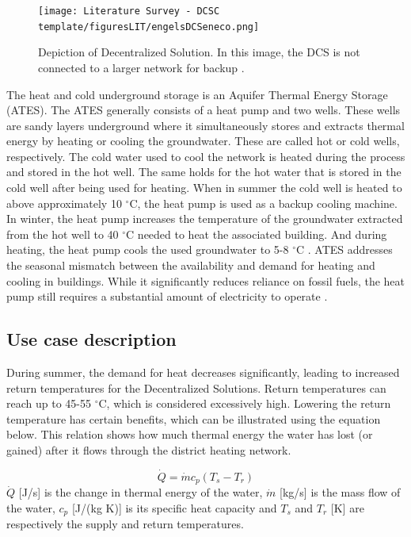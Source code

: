\begin{figure}[h]
    \centering
    \texttt{[image: Literature Survey - DCSC template/figuresLIT/engelsDCSeneco.png]}
    \caption{Depiction of Decentralized Solution. In this image, the DCS is not connected to a larger network for backup \cite{DCSeneco}.}
    \label{fig:DCS}
\end{figure}
The heat and cold underground storage is an Aquifer Thermal Energy Storage (ATES). The ATES generally consists of a heat pump and two wells. These wells are sandy layers underground where it simultaneously stores and extracts thermal energy by heating or cooling the groundwater. These are called hot or cold wells, respectively. The cold water used to cool the network is heated during the process and stored in the hot well. The same holds for the hot water that is stored in the cold well after being used for heating. When in summer the cold well is heated to above approximately 10 $^{\circ}\text{C}$, the heat pump is used as a backup cooling machine. In winter, the heat pump increases the temperature of the groundwater extracted from the hot well to 40 $^{\circ}\text{C}$ needed to heat the associated building. And during heating, the heat pump cools the used groundwater to 5-8 $^{\circ}\text{C}$ \cite{bloemendal2018hidden}. ATES addresses the seasonal mismatch between the availability and demand for heating and cooling in buildings. While it significantly reduces reliance on fossil fuels, the heat pump still requires a substantial amount of electricity to operate \cite{tudelft_ates_triplet}.

\subsection{Use case description}
During summer, the demand for heat decreases significantly, leading to increased return temperatures for the Decentralized Solutions. Return temperatures can reach up to 45-55 $^{\circ}\text{C}$, which is considered excessively high. Lowering the return temperature has certain benefits, which can be illustrated using the equation below. This relation shows how much thermal energy the water has lost (or gained) after it flows through the district heating network. 

\begin{equation}\label{eq::overallheat}
    \dot{Q} = \dot{m} c_p (T_s - T_r)
\end{equation}
$\dot{Q}$ [J/s] is the change in thermal energy of the water, $\dot{m}$ [kg/s] is the mass flow of the water, $c_p$ [J/(kg K)] is its specific heat capacity and $T_s$ and $T_r$ [K] are respectively the supply and return temperatures. 

